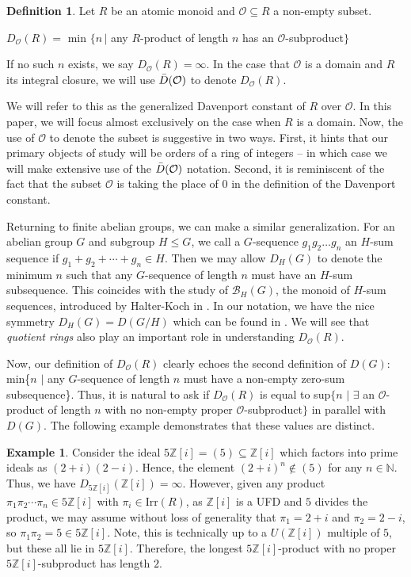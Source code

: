 \documentclass{amsart}
\theoremstyle{definition}
\newtheorem{defn}[lem]{Definition}
\newtheorem{ex}[lem]{Example}
\newcommand{\MO}{\mathcal{O}}
\newcommand{\bbz}{\mathbb{Z}}
\newcommand{\bbn}{\mathbb{N}}
\renewcommand{\leq}{\leqslant}
\numberwithin{equation}{section}
\begin{document}
\begin{defn}
    Let $R$ be an atomic monoid and $\mathcal{O} \subseteq R$ a non-empty subset.

    \begin{center}
        $D_\MO(R) =$ min $\{ n \,\vert$ any $R$-product of length $n$ has an $\mathcal{O}$-subproduct$\}$
    \end{center}

    If  no such $n$ exists, we say $D_\MO(R) = \infty$. In the case that $\MO$ is a domain and $R$ its integral closure, we will use $\Bar{D}(\MO)$ to denote $D_\MO(R)$.

\end{defn}

We will refer to this as the generalized Davenport constant of $R$ over $\mathcal{O}$. In this paper, we will focus almost exclusively on the case when $R$ is a domain. Now, the use of $\mathcal{O}$ to denote the subset is suggestive in two ways. First, it hints that our primary objects of study will be orders of a ring of integers -- in which case we will make extensive use of the $\Bar{D}(\MO)$ notation. Second, it is reminiscent of the fact that the subset $\mathcal{O}$ is taking the place of $0$ in the definition of the Davenport constant. 

Returning to finite abelian groups, we can make a similar generalization. For an abelian group $G$ and subgroup $H \leq G$, we call a $G$-sequence $g_1 g_2\dots g_n$ an $H$-sum sequence if $g_1 + g_2 + \dotsm + g_n \in H$. Then we may allow $D_H(G)$ to denote the minimum $n$ such that any $G$-sequence of length $n$ must have an $H$-sum subsequence. This coincides with the study of $\mathcal{B}_H(G)$, the monoid of $H$-sum sequences, introduced by Halter-Koch in \cite{halter1992relative}. In our notation, we have the nice symmetry $D_H(G) = D(G/H)$ which can be found in \cite{baeth2009atoms}. We will see that \textit{quotient rings} also play an important role in understanding $D_\mathcal{O}(R)$. 

Now, our definition of $D_{\MO}(R)$ clearly echoes the second definition of $D(G)$: min\{$n$ $\vert$ any $G$-sequence of length $n$ must have a non-empty zero-sum subsequence\}. Thus, it is natural to ask if $D_\MO(R)$ is equal to sup$\{n$ $\vert$ $\exists$ an $\MO$-product of length $n$ with no non-empty proper $\MO$-subproduct$\}$ in parallel with $D(G)$. The following example demonstrates that these values are distinct.


\begin{ex}
    Consider the ideal $5\bbz[i] = (5)  \subseteq \bbz[i]$ which factors into prime ideals as $(2 + i)(2 - i)$. Hence, the element $(2 + i)^n \notin (5)$ for any $n \in \bbn$. Thus, we have $D_{5\bbz[i]}(\bbz[i]) = \infty$. However, given any product $\pi_1 \pi_2 \dotsm \pi_n \in 5\bbz[i]$ with $\pi_i \in \text{Irr}(R)$, as $\bbz[i]$ is a UFD and $5$ divides the product, we may assume without loss of generality that $\pi_1 = 2 + i$ and  $\pi_2 = 2 - i$, so $\pi_1 \pi_2 = 5 \in 5\bbz[i]$. Note, this is technically up to a $U(\bbz[i])$ multiple of $5$, but these all lie in $5\bbz[i]$. Therefore, the longest $5\bbz[i]$-product with no proper $5\bbz[i]$-subproduct has length $2$.
\end{ex}
\end{document}
